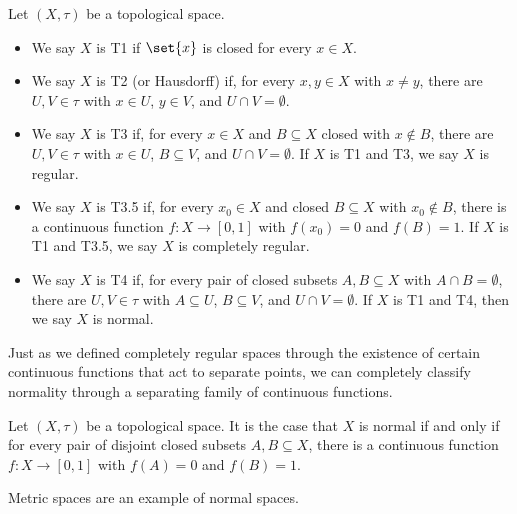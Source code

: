 \begin{definition}
Let $\left(X,\tau\right)$ be a topological space.
\begin{itemize}
  \item We say $X$ is T1 if $\set{x}$ is closed for every $x\in X$.
  \item We say $X$ is T2 (or Hausdorff) if, for every $x,y\in X$ with $x\neq y$, there are $U,V\in \tau$ with $x\in U$, $y\in V$, and $U\cap V = \emptyset$.
  \item We say $X$ is T3 if, for every $x\in X$ and $B\subseteq X$ closed with $x\notin B$, there are $U,V\in \tau$ with $x\in U$, $B\subseteq V$, and $U\cap V = \emptyset$. If $X$ is T1 and T3, we say $X$ is regular.
  \item We say $X$ is T3.5 if, for every $x_0\in X$ and closed $B\subseteq X$ with $x_0\notin B$, there is a continuous function $f\colon X\rightarrow [0,1]$ with $f\left(x_0\right) = 0$ and $f\left(B\right) = 1$. If $X$ is T1 and T3.5, we say $X$ is completely regular.
  \item We say $X$ is T4 if, for every pair of closed subsets $A,B\subseteq X$ with $A\cap B = \emptyset$, there are $U,V\in \tau$ with $A\subseteq U$, $B\subseteq V$, and $U\cap V = \emptyset$. If $X$ is T1 and T4, then we say $X$ is normal.
\end{itemize}
\end{definition}
Just as we defined completely regular spaces through the existence of certain continuous functions that act to separate points, we can completely classify normality through a separating family of continuous functions.
\begin{theorem}
  Let $\left(X,\tau\right)$ be a topological space. It is the case that $X$ is normal if and only if for every pair of disjoint closed subsets $A,B\subseteq X$, there is a continuous function $f\colon X\rightarrow [0,1]$ with $f\left(A\right) = 0$ and $f\left(B\right) = 1$.
\end{theorem}
\begin{remark}
  Metric spaces are an example of normal spaces.
\end{remark}
